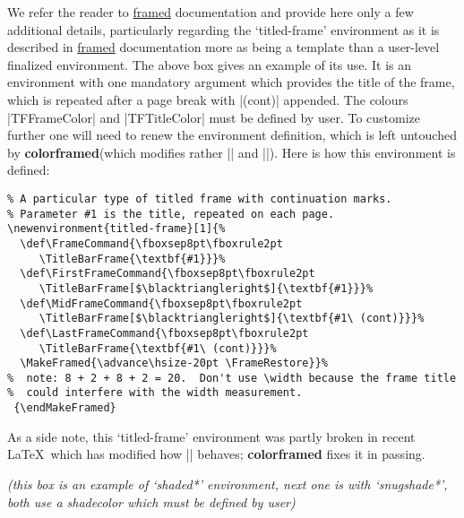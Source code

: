 \documentclass[a4paper,dvipdfmx,11pt]{article}
\def\ctanpackage#1{\href{https://ctan.org/pkg/#1}{#1}}
\newcommand\colorframed{%
        \texorpdfstring{{\color{joli}\bfseries colorframed}}{colorframed}\xspace}
\begin{document}
\begin{shaded*}
  We refer the reader to \ctanpackage{framed} documentation
  and provide here only a few additional details, particularly
  regarding the `titled-frame' environment as it is described
  in \ctanpackage{framed} documentation more as being a
  template than a user-level finalized environment.  The above
  box gives an example of its use.  It is an environment with
  one mandatory argument which provides the title of the
  frame, which is repeated after a page break with |(cont)|
  appended.  The colours |TFFrameColor| and
  |TFTitleColor| must be defined by user.  To customize
  further one will need to renew the environment definition,
  which is left untouched by \colorframed (which modifies
  rather |\TitleBarFrame| and |\CustomFBox|).  Here is
  how this environment is defined:\par
\begin{footnotesize}
\begin{verbatim}
% A particular type of titled frame with continuation marks.  
% Parameter #1 is the title, repeated on each page.
\newenvironment{titled-frame}[1]{%
  \def\FrameCommand{\fboxsep8pt\fboxrule2pt
     \TitleBarFrame{\textbf{#1}}}%
  \def\FirstFrameCommand{\fboxsep8pt\fboxrule2pt
     \TitleBarFrame[$\blacktriangleright$]{\textbf{#1}}}%
  \def\MidFrameCommand{\fboxsep8pt\fboxrule2pt
     \TitleBarFrame[$\blacktriangleright$]{\textbf{#1\ (cont)}}}%
  \def\LastFrameCommand{\fboxsep8pt\fboxrule2pt
     \TitleBarFrame{\textbf{#1\ (cont)}}}%
  \MakeFramed{\advance\hsize-20pt \FrameRestore}}%
%  note: 8 + 2 + 8 + 2 = 20.  Don't use \width because the frame title
%  could interfere with the width measurement.
 {\endMakeFramed}
\end{verbatim}
\normalcolor
As a side note, this `titled-frame' environment was partly
broken in recent \LaTeX\ which has modified how |\smash|
behaves; \colorframed fixes it in passing.\par

\emph{(this box is an example of \emph{`shaded*'} environment, next one is with
\emph{`snugshade*'}, both use a \emph{shadecolor} which must be defined by user)}
\par
\end{footnotesize}
\end{shaded*}
\end{document}
